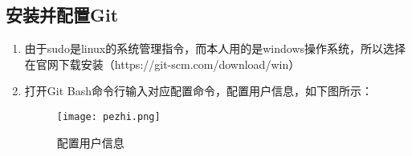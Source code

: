 \documentclass{zjureport}
\begin{document}
	
	
	\subsection{安装并配置Git}
	\begin{enumerate}
		\item 由于sudo是linux的系统管理指令，而本人用的是windows操作系统，所以选择在官网下载安装（https://git-scm.com/download/win）
		
		\item{打开Git Bash命令行输入对应配置命令，配置用户信息，如下图所示：}
		
		\begin{figure}[!htbp]
			\centering
			\texttt{[image: pezhi.png]}
			\caption{配置用户信息}
			\label{fig:dist}
		\end{figure}
	\end{enumerate}
\end{document}
